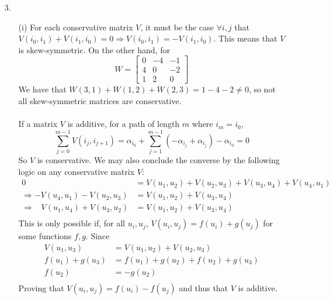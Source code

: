 \documentclass[11pt]{article}
\theoremstyle{definition}
\begin{document}
\begin{itemize}
\begin{itemize}
        \end{itemize}
    \item[3.]
        \begin{itemize}
            \item[(i)]
                For each conservative matrix $V$, it must be the case $\forall i,j$ that \(V(i_0,i_1)+V(i_1,i_0)=0\Longrightarrow V(i_0,i_1)=-V(i_1,i_0) \). This means that $V$ is skew-symmetric. On the other hand, for 
                \[ W = \left[ \begin{array}{ccc} 0 & -4 & -1 \\ 4 & 0 & -2 \\ 1 & 2 & 0 \end{array} \right] \]  
                We have that \(W(3,1)+W(1,2)+W(2,3)= 1 -4 -2 \neq 0\), so not all skew-symmetric matrices are conservative. \\
                \vspace{5mm} \\
                If a matrix $V$ is additive, for a path of length $m$ where $i_m=i_0$,
                \[ \sum_{j=0}^{m-1} V(i_j,i_{j+1}) = \alpha_{i_0} + \sum_{j=1}^{m-1}(-\alpha_{i_j}+\alpha_{i_j}) - \alpha_{i_0} = 0 \]
                So $V$ is conservative. We may also conclude the converse by the following logic on any conservative matrix $V$:
                \begin{align*}
                    0 &= V(u_1,u_2) + V(u_2,u_3) + V(u_3,u_4) +V(u_4,u_1) \\
                    \Longrightarrow -V(u_4,u_1) - V(u_2,u_3) &= V(u_1,u_2) + V(u_3,u_4) \\
                    \Longrightarrow \;\;\; V(u_1,u_4) + V(u_3,u_2) &= V(u_1,u_2) + V(u_3,u_4) \\
                \end{align*}
                This is only possible if, for all $u_i, u_j$, $V(u_i,u_j)=f(u_i)+g(u_j)$ for some functions $f, g$. Since 
                \begin{align*}
                    V(u_1,u_3) &= V(u_1,u_2) + V(u_2,u_3) \\
                    f(u_1) + g(u_3) &= f(u_1) + g(u_2) + f(u_2) + g(u_3) \\
                    f(u_2) &= -g(u_2) \\
                \end{align*}
                Proving that $V(u_i,u_j) = f(u_i) - f(u_j)$ and thus that $V$ is additive. \\
                \vspace{5mm} \\

\end{itemize}
\end{itemize}
\end{document}
